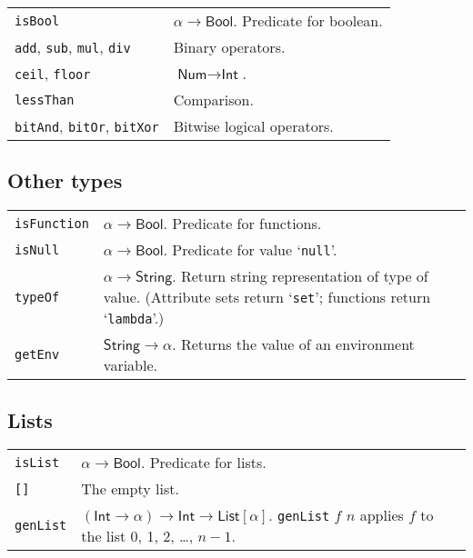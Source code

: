 \documentclass[9pt, a4paper, landscape]{extarticle}
\newcommand{\cmd}[1]{\texttt{#1}}
\newcommand{\str}{\textsf{String}}
\newcommand{\itg}{\textsf{Int}} %
\newcommand{\num}{\textsf{Num}} %
\newcommand{\lst}{\textsf{List}}
\newcommand{\bln}{\textsf{Bool}}
\begin{document}
\begin{multicols*}{3}
\begin{tabularx}{\columnwidth}{@{}l>{\raggedright\arraybackslash}X@{}}
  \cmd{isBool} & $\alpha\to\bln$. Predicate for boolean. \\

  \cmd{add}, \cmd{sub}, \cmd{mul}, \cmd{div} & Binary operators. \\

  \cmd{ceil}, \cmd{floor} & $\num\to\itg$. \\

  \cmd{lessThan} & Comparison. \\

  \cmd{bitAnd}, \cmd{bitOr}, \cmd{bitXor} & Bitwise logical
  operators. \\
\end{tabularx}


\subsection*{Other types}

\begin{tabularx}{\columnwidth}{@{}l>{\raggedright\arraybackslash}X@{}}
  \cmd{isFunction} & $\alpha\to\bln$. Predicate for functions. \\

  \cmd{isNull} & $\alpha\to\bln$. Predicate for value `\cmd{null}'. \\

  \cmd{typeOf} & $\alpha\to\str$. Return string representation of type of
  value. (Attribute sets return `\cmd{set}'; functions return
  `\cmd{lambda}'.) \\

  \cmd{getEnv} & $\str\to\alpha$. Returns the value of an environment variable. 

  
\end{tabularx}



\subsection*{Lists}
\begin{tabularx}{\columnwidth}{@{}l>{\raggedright\arraybackslash}X@{}}
  \cmd{isList}      & $\alpha\to\bln$. Predicate for lists. \\
  \cmd{[]}          & The empty list. \\
  \cmd{genList}     & $(\itg\to\alpha)\to\itg\to\lst[\alpha]$.\newline
  \cmd{genList} $f$ $n$ applies $f$ to the list 0, 1, 2, \dots, $n-1$. \\


\end{tabularx}
\end{multicols*}
\end{document}
